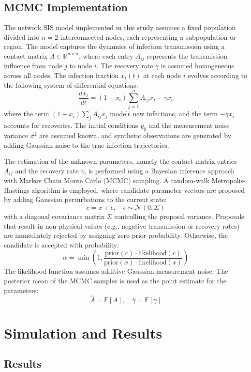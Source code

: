 \documentclass[a4paper,10pt]{report}
\begin{document}
\subsection{MCMC Implementation}

The network SIS model implemented in this study assumes a fixed population divided into $n = 2$ interconnected nodes, each representing a subpopulation or region. The model captures the dynamics of infection transmission using a contact matrix $A \in \mathbb{R}^{n \times n}$, where each entry $A_{ij}$ represents the transmission influence from node $j$ to node $i$. The recovery rate $\gamma$ is assumed homogeneous across all nodes. The infection fraction $x_i(t)$ at each node $i$ evolves according to the following system of differential equations:
\[
\frac{dx_i}{dt} = (1 - x_i) \sum_{j=1}^{n} A_{ij} x_j - \gamma x_i
\]
where the term $(1 - x_i) \sum_j A_{ij} x_j$ models new infections, and the term $-\gamma x_i$ accounts for recoveries. The initial conditions $y_0$ and the measurement noise variance $\sigma^2$ are assumed known, and synthetic observations are generated by adding Gaussian noise to the true infection trajectories.

The estimation of the unknown parameters, namely the contact matrix entries $A_{ij}$ and the recovery rate $\gamma$, is performed using a Bayesian inference approach with Markov Chain Monte Carlo (MCMC) sampling. A random-walk Metropolis-Hastings algorithm is employed, where candidate parameter vectors are proposed by adding Gaussian perturbations to the current state:
\[
c = x + \epsilon, \quad \epsilon \sim \mathcal{N}(0, \Sigma)
\]
with a diagonal covariance matrix $\Sigma$ controlling the proposal variance. Proposals that result in non-physical values (e.g., negative transmission or recovery rates) are immediately rejected by assigning zero prior probability. Otherwise, the candidate is accepted with probability:
\[
\alpha = \min \left(1, \frac{\text{prior}(c) \cdot \text{likelihood}(c)}{\text{prior}(x) \cdot \text{likelihood}(x)} \right)
\]
The likelihood function assumes additive Gaussian measurement noise. The posterior mean of the MCMC samples is used as the point estimate for the parameters:
\[
\hat{A} = \mathbb{E}[A], \quad \hat{\gamma} = \mathbb{E}[\gamma]
\]


\newpage
\section{Simulation and Results}

\subsection{Results}
\end{document}
